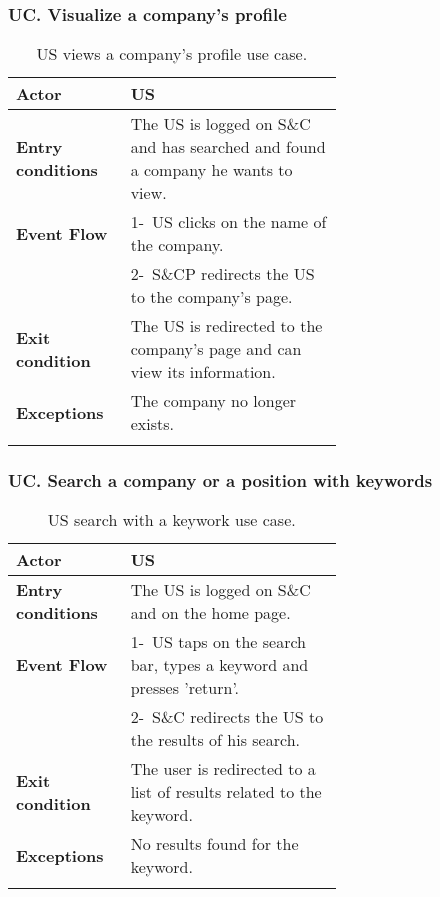 \subsubsection*{UC\cuc . Visualize a company's profile}
\begin{center}
    \begin{longtable}{|l|p{0.65\linewidth}|}
        \hline
        \textbf{Actor}            & US \\
        \hline
        \textbf{Entry conditions} & The US is logged on S\&C and has searched and found a company he wants to view. \\
        \hline
        \textbf{Event Flow}       & 1-\ US clicks on the name of the company.  \\
        & 2-\ S\&CP redirects the US to the company's page.\\
        \hline
        \textbf{Exit condition}   &  The US is redirected to the company's page and can view its information.\\
        \hline
        \textbf{Exceptions}       & The company no longer exists. \\
        \hline
        \caption{US views a company's profile use case.}
        \label{tab: cp_use_case}
    \end{longtable}
\end{center}

\subsubsection*{UC\cuc . Search a company or a position with keywords }
\begin{center}
    \begin{longtable}{|l|p{0.65\linewidth}|}
        \hline
        \textbf{Actor}            & US \\
        \hline
        \textbf{Entry conditions} & The US is logged on S\&C and on the home page. \\
        \hline
        \textbf{Event Flow}       & 1-\ US taps on the search bar, types a keyword and presses 'return'.  \\
        & 2-\ S\&C redirects the US to the results of his search.\\
        \hline
        \textbf{Exit condition}   &  The user is redirected to a list of results related to the keyword. \\
        \hline
        \textbf{Exceptions}       & No results found for the keyword. \\
        \hline
        \caption{US search with a keywork use case.}
        \label{tab: cp_use_case}
    \end{longtable}
\end{center}



